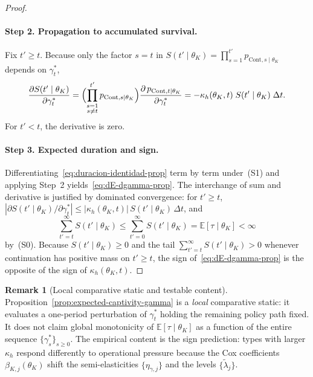 \documentclass[ecta,nameyear,final,supplement]{econsocart}
\numberwithin{equation}{section}
\numberwithin{table}{section}
\theoremstyle{definition}
\newtheorem{remark}[theorem]{Remark}
\begin{document}
\begin{proof}
\paragraph{Step 2. Propagation to accumulated survival.}
Fix $t'\ge t$. Because only the factor $s=t$ in
$S(t'\mid\theta_K)=\prod_{s=1}^{t'}p_{\mathrm{Cont},s\mid\theta_K}$ depends on
$\gamma_t^\ast$,
\[
\frac{\partial S(t'\mid\theta_K)}{\partial\gamma_t^\ast}
=\Bigl(\prod_{\substack{s=1\\s\neq t}}^{t'}p_{\mathrm{Cont},s\mid\theta_K}\Bigr)
\frac{\partial\,p_{\mathrm{Cont},t\mid\theta_K}}{\partial\gamma_t^\ast}
=-\kappa_h(\theta_K,t)\;S(t'\mid\theta_K)\;\Delta t.
\]
For $t'<t$, the derivative is zero.

\paragraph{Step 3. Expected duration and sign.}
Differentiating~\eqref{eq:duracion-identidad-prop} term by term under~\textup{(S1)}
and applying Step~2 yields~\eqref{eq:dE-dgamma-prop}. The interchange of sum and
derivative is justified by dominated convergence: for $t'\ge t$,
$|\partial S(t'\mid\theta_K)/\partial\gamma_t^\ast|
\le|\kappa_h(\theta_K,t)|\,S(t'\mid\theta_K)\,\Delta t$, and
\[
\sum_{t'=t}^{\infty}S(t'\mid\theta_K)
\le\sum_{t'=0}^{\infty}S(t'\mid\theta_K)
=\mathbb{E}[\tau\mid\theta_K]<\infty
\]
by~\textup{(S0)}. Because $S(t'\mid\theta_K)\ge 0$ and the tail
$\sum_{t'=t}^{\infty}S(t'\mid\theta_K)>0$ whenever continuation has positive
mass on $t'\ge t$, the sign of~\eqref{eq:dE-dgamma-prop} is the opposite of the
sign of $\kappa_h(\theta_K,t)$.
\end{proof}

\begin{remark}[Local comparative static and testable content]
\label{rem:captivity-local-cs}
Proposition~\ref{prop:expected-captivity-gamma} is a \emph{local} comparative
static: it evaluates a one-period perturbation of $\gamma_t^\ast$ holding the
remaining policy path fixed. It does not claim global monotonicity of
$\mathbb{E}[\tau\mid\theta_K]$ as a function of the entire sequence
$\{\gamma_s^\ast\}_{s\ge 0}$. The empirical content is the sign prediction:
types with larger $\kappa_h$ respond differently to operational pressure because
the Cox coefficients $\beta_{K,j}(\theta_K)$ shift the semi-elasticities
$\{\eta_{\gamma,j}\}$ and the levels $\{\tilde\lambda_j\}$.
\end{remark}

\end{document}
